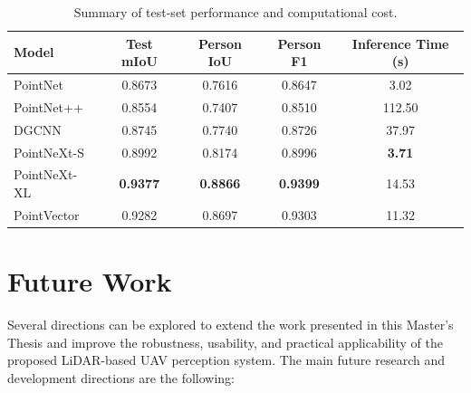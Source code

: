 \begin{table}[H]
    \centering
    \caption{Summary of test-set performance and computational cost.}
    \label{tab:conclusion_results}
    \begin{tabular}{lcccc}
        \hline
        \textbf{Model} & \textbf{Test mIoU} & \textbf{Person IoU} & 
        \textbf{Person F1} & \textbf{Inference Time (s)} \\
        \hline
        PointNet     & 0.8673 & 0.7616 & 0.8647 & 3.02 \\
        PointNet++   & 0.8554 & 0.7407 & 0.8510 & 112.50 \\
        DGCNN        & 0.8745 & 0.7740 & 0.8726 & 37.97 \\
        PointNeXt-S  & 0.8992 & 0.8174 & 0.8996 & \textbf{3.71} \\
        PointNeXt-XL & \textbf{0.9377} & \textbf{0.8866} & 
        \textbf{0.9399} & 14.53 \\
        PointVector  & 0.9282 & 0.8697 & 0.9303 & 11.32 \\
        \hline
    \end{tabular}
\end{table}

\section{Future Work}

Several directions can be explored to extend the work presented in this Master's Thesis and improve the robustness, usability, and practical applicability of the proposed LiDAR-based UAV perception system. The main future research and development directions are the following:

